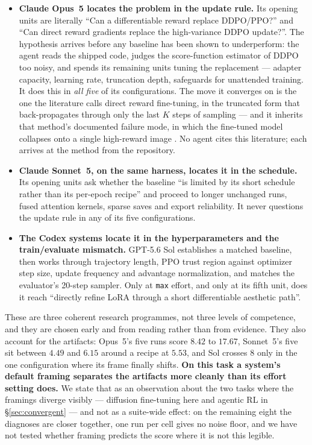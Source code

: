 \begin{itemize}[leftmargin=*,itemsep=2pt,topsep=3pt]
\item \textbf{Claude Opus~5 locates the problem in the update rule.} Its opening units are literally
``Can a differentiable reward replace DDPO/PPO?'' and ``Can direct reward gradients replace the
high-variance DDPO update?''. The hypothesis arrives before any baseline has been shown to
underperform: the agent reads the shipped code, judges the score-function estimator of DDPO
\citep{black2023ddpo} too noisy, and spends its remaining units tuning the replacement --- adapter
capacity, learning rate, truncation depth, safeguards for unattended training. It does this in
\emph{all five} of its configurations. The move it converges on is the one the literature calls direct
reward fine-tuning, in the truncated form that back-propagates through only the last $K$ steps of
sampling \citep{clark2024draft} --- and it inherits that method's documented failure mode, in which the
fine-tuned model collapses onto a single high-reward image \citep{clark2024draft,black2023ddpo}. No
agent cites this literature; each arrives at the method from the repository.
\item \textbf{Claude Sonnet~5, on the same harness, locates it in the schedule.} Its opening units
ask whether the baseline ``is limited by its short schedule rather than its per-epoch recipe'' and
proceed to longer unchanged runs, fused attention kernels, sparse saves and export reliability. It
never questions the update rule in any of its five configurations.
\item \textbf{The Codex systems locate it in the hyperparameters and the train/evaluate mismatch.}
GPT-5.6 Sol establishes a matched baseline, then works through trajectory length, PPO trust region
against optimizer step size, update frequency and advantage normalization, and matches the
evaluator's 20-step sampler. Only at \texttt{max} effort, and only at its fifth unit, does it reach
``directly refine LoRA through a short differentiable aesthetic path''.
\end{itemize}

These are three coherent research programmes, not three levels of competence, and they are chosen
early and from reading rather than from evidence. They also account for the artifacts: Opus~5's five
runs score $8.42$ to $17.67$, Sonnet~5's five sit between $4.49$ and $6.15$ around a recipe at $5.53$,
and Sol crosses $8$ only in the one configuration where its frame finally shifts. \textbf{On this task
a system's default framing separates the artifacts more cleanly than its effort setting does.} We
state that as an observation about the two tasks where the framings diverge visibly --- diffusion
fine-tuning here and agentic RL in \S\ref{sec:convergent} --- and not as a suite-wide effect: on the
remaining eight the diagnoses are closer together, one run per cell gives no noise floor, and we have
not tested whether framing predicts the score where it is not this legible.

